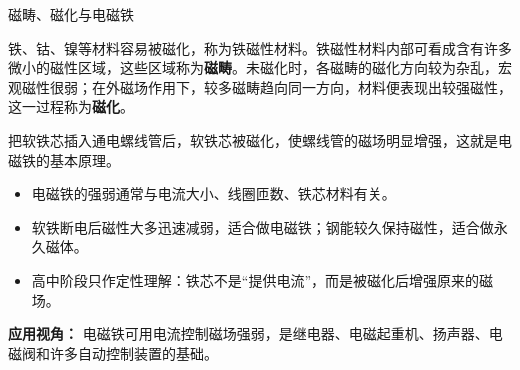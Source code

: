 \begin{conceptbox}{磁畴、磁化与电磁铁}

铁、钴、镍等材料容易被磁化，称为铁磁性材料。铁磁性材料内部可看成含有许多微小的磁性区域，这些区域称为\textbf{磁畴}。未磁化时，各磁畴的磁化方向较为杂乱，宏观磁性很弱；在外磁场作用下，较多磁畴趋向同一方向，材料便表现出较强磁性，这一过程称为\textbf{磁化}。

把软铁芯插入通电螺线管后，软铁芯被磁化，使螺线管的磁场明显增强，这就是电磁铁的基本原理。

\begin{center}
\begin{minipage}{0.98\linewidth}
\centering


\label{fig:magnetic-material-electromagnet}
\end{minipage}
\end{center}

\begin{itemize}
  \item 电磁铁的强弱通常与电流大小、线圈匝数、铁芯材料有关。
  \item 软铁断电后磁性大多迅速减弱，适合做电磁铁；钢能较久保持磁性，适合做永久磁体。
  \item 高中阶段只作定性理解：铁芯不是“提供电流”，而是被磁化后增强原来的磁场。
\end{itemize}

\textbf{应用视角：} 电磁铁可用电流控制磁场强弱，是继电器、电磁起重机、扬声器、电磁阀和许多自动控制装置的基础。

\end{conceptbox}

